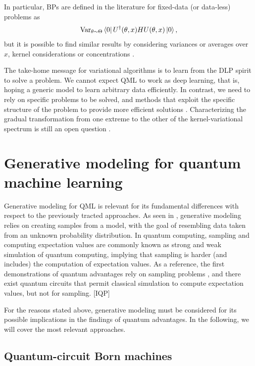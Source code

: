 \documentclass[]{report}
\begin{document}
In particular, BPs are defined in the literature for fixed-data (or data-less) problems as
\begin{equation}
\operatorname{Var}_{\theta \sim \Theta} \bra 0 U^\dagger(\theta, x) H U(\theta, x) \ket 0, 
\end{equation}
but it is possible to find similar results by considering variances or averages over $x$, kernel considerations or concentrations \cite{thanasilp2024exponential, barthe2024gradients}. 

The take-home message for variational algorithms is to learn from the DLP spirit to solve a problem. We cannot expect QML to work as deep learning, that is, hoping a generic model to learn arbitrary data efficiently. In contrast, we need to rely on specific problems to be solved, and methods that exploit the specific structure of the problem to provide more efficient solutions \cite{aaronson2022how}. Characterizing the gradual transformation from one extreme to the other of the kernel-variational spectrum is still an open question \cite{gil-fuster2024relation}.

\section{Generative modeling for quantum machine learning}

Generative modeling for QML is relevant for its fundamental differences with respect to the previously tracted approaches. As seen in , generative modeling relies on creating samples from a model, with the goal of resembling data taken from an unknown probability distribution. In quantum computing, sampling and computing expectation values are commonly known as strong and weak simulation of quantum computing, implying that sampling is harder (and includes) the computation of expectation values. As a reference, the first demonstrations of quantum advantages rely on sampling problems \cite{arute2019quantum, zhong2020quantum}, and there exist quantum circuits that permit classical simulation to compute expectation values, but not for sampling. [IQP] 

For the reasons stated above, generative modeling must be considered for its possible implications in the findings of quantum advantages. In the following, we will cover the most relevant approaches. 

\subsection{Quantum-circuit Born machines}
\end{document}
